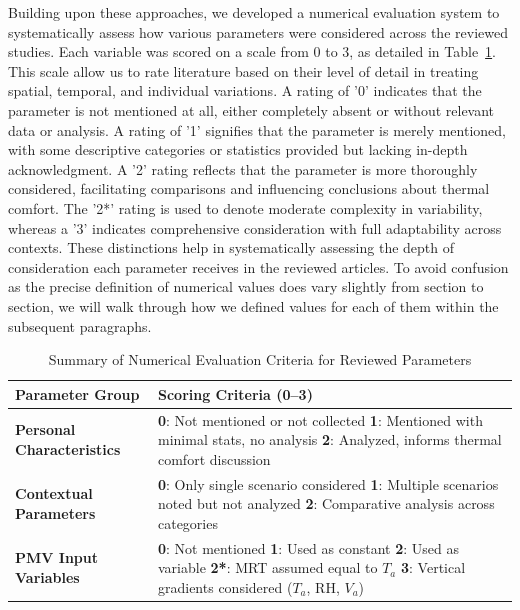 \documentclass[final,3p,times,12pt]{elsarticle}
\begin{document}
Building upon these approaches, we developed a numerical evaluation system to systematically assess how various parameters were considered across the reviewed studies. Each variable was scored on a scale from 0 to 3, as detailed in Table~\ref{tab:numerical-criteria}. This scale allow us to rate literature based on their level of detail in treating spatial, temporal, and individual variations. A rating of '0' indicates that the parameter is not mentioned at all, either completely absent or without relevant data or analysis. A rating of '1' signifies that the parameter is merely mentioned, with some descriptive categories or statistics provided but lacking in-depth acknowledgment. A '2' rating reflects that the parameter is more thoroughly considered, facilitating comparisons and influencing conclusions about thermal comfort. The '2*' rating is used to denote moderate complexity in variability, whereas a '3' indicates comprehensive consideration with full adaptability across contexts. These distinctions help in systematically assessing the depth of consideration each parameter receives in the reviewed articles. To avoid confusion as the precise definition of numerical values does vary slightly from section to section, we will walk through how we defined values for each of them within the subsequent paragraphs. 

\begin{table}[ht]
\centering
\begin{tabular}{p{5cm} p{10cm}}
\hline
\textbf{Parameter Group} & \textbf{Scoring Criteria (0–3)} \\
\hline
\textbf{Personal Characteristics} & 
\textbf{0}: Not mentioned or not collected \newline
\textbf{1}: Mentioned with minimal stats, no analysis \newline
\textbf{2}: Analyzed, informs thermal comfort discussion \\\hline

\textbf{Contextual Parameters} & 
\textbf{0}: Only single scenario considered \newline
\textbf{1}: Multiple scenarios noted but not analyzed \newline
\textbf{2}: Comparative analysis across categories \\\hline

\textbf{PMV Input Variables} & 
\textbf{0}: Not mentioned \newline
\textbf{1}: Used as constant \newline
\textbf{2}: Used as variable \newline
\textbf{2*}: MRT assumed equal to $T_a$ \newline
\textbf{3}: Vertical gradients considered ($T_a$, RH, $V_a$) \\
\hline
\end{tabular}
\caption{Summary of Numerical Evaluation Criteria for Reviewed Parameters}
\label{tab:numerical-criteria}
\end{table}
\end{document}
